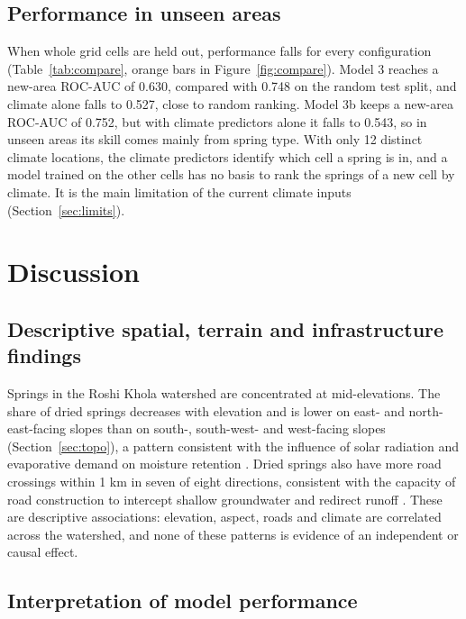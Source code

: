 \documentclass[12pt,a4paper]{article}
\begin{document}
\subsection{Performance in unseen areas}\label{sec:newarea}

When whole grid cells are held out, performance falls for every configuration (Table~\ref{tab:compare}, orange bars in Figure~\ref{fig:compare}). Model 3 reaches a new-area ROC-AUC of 0.630, compared with 0.748 on the random test split, and climate alone falls to 0.527, close to random ranking. Model 3b keeps a new-area ROC-AUC of 0.752, but with climate predictors alone it falls to 0.543, so in unseen areas its skill comes mainly from spring type. With only 12 distinct climate locations, the climate predictors identify which cell a spring is in, and a model trained on the other cells has no basis to rank the springs of a new cell by climate. It is the main limitation of the current climate inputs (Section~\ref{sec:limits}).

\clearpage
\section{Discussion}\label{sec:discussion}

\subsection{Descriptive spatial, terrain and infrastructure findings}

Springs in the Roshi Khola watershed are concentrated at mid-elevations. The share of dried springs decreases with elevation and is lower on east- and north-east-facing slopes than on south-, south-west- and west-facing slopes (Section~\ref{sec:topo}), a pattern consistent with the influence of solar radiation and evaporative demand on moisture retention \citep{gutierrez2013,broxton2009}. Dried springs also have more road crossings within 1 km in seven of eight directions, consistent with the capacity of road construction to intercept shallow groundwater and redirect runoff \citep{montgomery1994,dutton2005}. These are descriptive associations: elevation, aspect, roads and climate are correlated across the watershed, and none of these patterns is evidence of an independent or causal effect.

\subsection{Interpretation of model performance}\label{sec:interpret}
\end{document}
